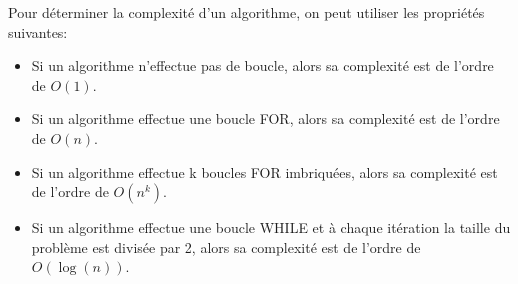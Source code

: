 \begin{propriete}{}
	Pour déterminer la complexité d'un algorithme, on peut utiliser les propriétés suivantes:

	\begin{itemize}
		\item Si un algorithme n'effectue pas de boucle, alors sa complexité est de l'ordre de $O(1)$.
		\item Si un algorithme effectue une boucle FOR, alors sa complexité est de l'ordre de $O(n)$.
		\item Si un algorithme effectue k boucles FOR imbriquées, alors sa complexité est de l'ordre de $O(n^k)$.
		\item Si un algorithme effectue une boucle WHILE et à chaque itération la taille du problème est divisée par 2, alors sa complexité est de l'ordre de $O(\log(n))$.
	\end{itemize}
\end{propriete}

